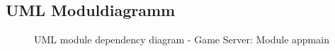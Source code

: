 \documentclass[11pt,ngerman]{article}
\begin{document}
        \subsection{UML Moduldiagramm}
             \begin{figure}[H]
                \centering
                \caption{UML module dependency diagram - Game Server: Module appmain}
                \label{fig:GameServerModulDiagramm}
            \end{figure}
\end{document}
